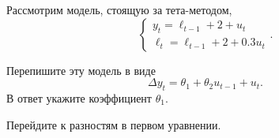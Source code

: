
\begin{question}
Рассмотрим модель, стоящую за тета-методом,
\[
\begin{cases}
y_t = \ell_{t-1} + 2 + u_t \\
\ell_t = \ell_{t-1} + 2 + 0.3 u_t
\end{cases}.
\]

Перепишите эту модель в виде
\[
\Delta y_t = \theta_1 + \theta_2 u_{t-1} + u_t.
\]
В ответ укажите коэффициент \(\theta_1\).
\end{question}

\begin{solution}
Перейдите к разностям в первом уравнении.
\end{solution}

